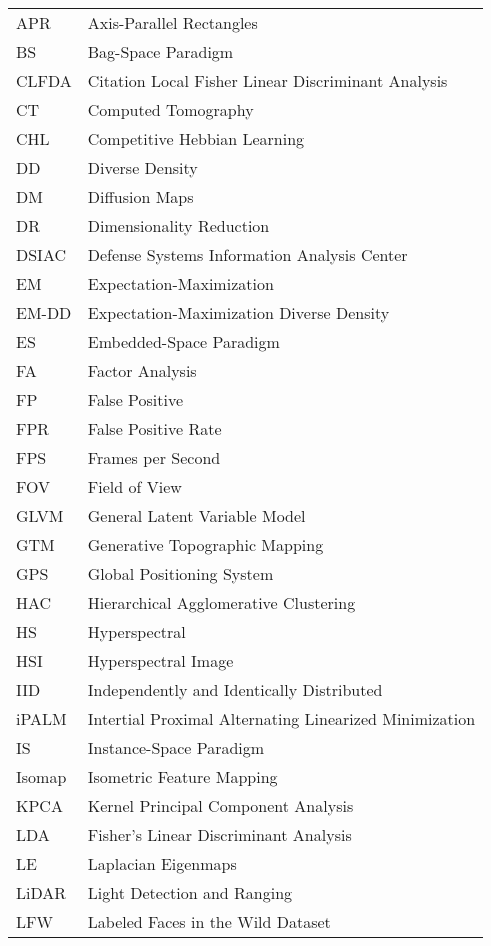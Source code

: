 \begin{longtable}{l p{5in}} %

APR & Axis-Parallel Rectangles\\
BS & Bag-Space Paradigm\\
CLFDA &  Citation Local Fisher Linear Discriminant Analysis\\
CT & Computed Tomography\\
CHL & Competitive Hebbian Learning\\
DD & Diverse Density\\
DM & Diffusion Maps\\
DR & Dimensionality Reduction\\
DSIAC & Defense Systems Information Analysis Center\\
EM & Expectation-Maximization\\
EM-DD & Expectation-Maximization Diverse Density\\
ES & Embedded-Space Paradigm\\
FA & Factor Analysis\\
FP & False Positive\\ 
FPR & False Positive Rate\\
FPS & Frames per Second\\
FOV & Field of View\\
GLVM & General Latent Variable Model\\
GTM & Generative Topographic Mapping\\
GPS & Global Positioning System\\
HAC & Hierarchical Agglomerative Clustering\\
HS & Hyperspectral\\
HSI & Hyperspectral Image\\
IID & Independently and Identically Distributed\\
iPALM & Intertial Proximal Alternating Linearized Minimization\\
IS & Instance-Space Paradigm\\
Isomap & Isometric Feature Mapping\\
KPCA & Kernel Principal Component Analysis\\
LDA & Fisher's Linear Discriminant Analysis\\
LE & Laplacian Eigenmaps\\
LiDAR & Light Detection and Ranging\\
LFW & Labeled Faces in the Wild Dataset\\

\end{longtable}
